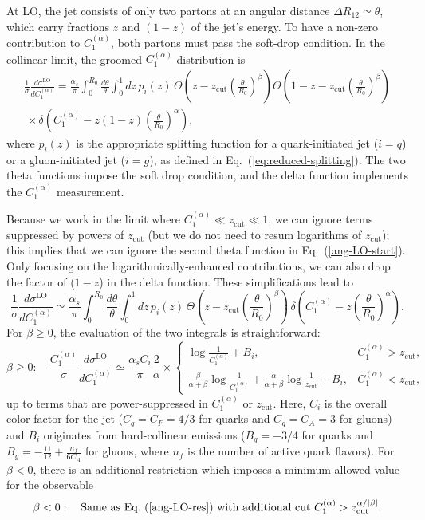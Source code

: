 \documentclass[letterpaper,11pt]{article}
\newcommand{\as}{\alpha_s}
\newcommand{\C}[2]{C^{(#2)}_{#1}}
\newcommand{\zcut}{z_\text{cut}}
\newcommand{\ea}{{\C{1}{\alpha}}}
\DeclareRobustCommand{\Eq}[1]{Eq.~(\ref{#1})}
\begin{document}
At LO, the jet consists of only two partons at an angular distance $\Delta R_{12}\simeq \theta$, which carry fractions $z$ and $(1-z)$ of the jet's energy.  To have a non-zero contribution to $\ea$, both partons must pass the soft-drop condition.  In the collinear limit, the groomed $\ea$ distribution is
\begin{multline}\label{ang-LO-start}
\frac{1}{\sigma}\frac{d \sigma^\text{LO}}{d \ea}=\frac{ \as}{\pi} \int_0^{R_0} \frac{d \theta}{\theta} \int_0^1 d z\, p_i(z) \, 
\Theta\left(z-\zcut \left(\frac{\theta}{R_0} \right)^\beta \right)\Theta\left(1-z-\zcut \left(\frac{\theta}{R_0} \right)^\beta \right)  \\ ~\times \delta \left(\ea - z(1-z) \left(\frac{\theta}{R_0} \right)^\alpha \right),
\end{multline}
where $p_i(z)$ is the appropriate splitting function for a quark-initiated jet ($i=q$) or a gluon-initiated jet ($i=g$), as defined in \Eq{eq:reduced-splitting}.  The two theta functions impose the soft drop condition, and the delta function implements the $\ea$ measurement.

Because we work in the limit where $\ea\ll\zcut\ll1$, we can ignore terms suppressed by powers of $\zcut$ (but we do not need to resum logarithms of $\zcut$); this implies that we can ignore the second theta function in \Eq{ang-LO-start}.  Only focusing on the logarithmically-enhanced contributions, we can also drop the factor of ($1-z$) in the delta function.  These simplifications lead to
\begin{equation}
\label{ang-LO-mid}
\frac{1}{\sigma}\frac{d \sigma^\text{LO}}{d \ea} \simeq \frac{\as}{\pi} \int_0^{R_0} \frac{d \theta}{\theta} \int_0^1 d z\, p_i(z) \, 
\Theta\left(z-\zcut \left(\frac{\theta}{R_0} \right)^\beta \right) \, \delta \left(\ea - z \left(\frac{\theta}{R_0} \right)^\alpha \right).
\end{equation}
For $\beta \ge 0$, the evaluation of the two integrals is straightforward:
\begin{equation}
\label{ang-LO-res}
\beta \ge 0: \quad \frac{\ea}{\sigma}\frac{d \sigma^\text{LO}}{d \ea} \simeq \frac{\as C_i}{\pi}\frac{2}{\alpha} \times
\begin{cases}
\log \frac{1}{\ea}+ B_i , & \ea > \zcut, \\
\frac{\beta}{\alpha+\beta} \log \frac{1}{\ea}+ \frac{\alpha}{\alpha+\beta}\log \frac{1}{\zcut} +B_i, & \ea < \zcut,
\end{cases}
\end{equation}
up to terms that are power-suppressed in $\ea$ or $\zcut$.
Here, $C_i$ is the overall color factor for the jet ($C_q = C_F = 4/3$ for quarks and $C_g = C_A = 3$ for gluons) and $B_i$ originates from hard-collinear emissions ($B_q = -3/4$ for quarks and $B_g = -\frac{11}{12}+\frac{n_f}{6C_A} $ for gluons, where $n_f$ is the number of active quark flavors).  For $\beta < 0$, there is an additional restriction which imposes a minimum allowed value for the observable
\begin{equation}
\label{eq:negbetaminvalue}
\beta < 0:  \quad \text{Same as \Eq{ang-LO-res} with additional cut } \ea> \zcut^{\alpha/ |\beta|}.
\end{equation}
\end{document}
